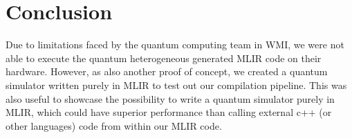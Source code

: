 \chapter{Conclusion}
Due to limitations faced by the quantum computing team in WMI, we were not able to execute
    the quantum heterogeneous generated MLIR code on their hardware.
    However, as also another proof of concept, we created a quantum simulator written purely in MLIR
    to test out our compilation pipeline. This was also useful to
     showcase the possibility to write a quantum simulator purely in MLIR,
    which could have superior performance than calling external c++ (or other languages) code from within our MLIR code.